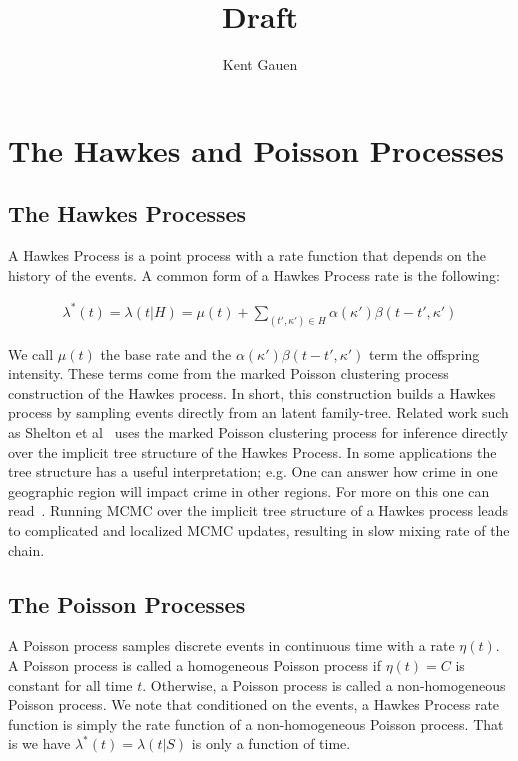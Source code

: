 \documentclass[11pt]{article}
\author{Kent Gauen}
\title{Draft}
\begin{document}
\maketitle

\section{The Hawkes and Poisson Processes}

\subsection{The Hawkes Processes}

\noindent A Hawkes Process is a point process with a rate function that depends on the history of the events. A common form of a Hawkes Process rate is the following:

\begin{align}
  \lambda^*(t)
  =
  \lambda(t|H)
  =
  \mu(t)
  +
  \sum_{(t',\kappa')\in H}\alpha(\kappa')\beta(t-t',\kappa')
\end{align}

\noindent We call $\mu(t)$ the base rate and the $\alpha(\kappa')\beta(t-t',\kappa')$ term the offspring intensity. These terms come from the marked Poisson clustering process construction of the Hawkes process. In short, this construction builds a Hawkes process by sampling events directly from an latent family-tree. Related work such as Shelton et al~\cite{AAAI1816985} uses the marked Poisson clustering process for inference directly over the implicit tree structure of the Hawkes Process. In some applications the tree structure has a useful interpretation; e.g. One can answer how crime in one geographic region will impact crime in other regions. For more on this one can read~\cite{Rasmussen2013}. Running MCMC over the implicit tree structure of a Hawkes process leads to complicated and localized MCMC updates, resulting in slow mixing rate of the chain.

\subsection{The Poisson Processes}

\noindent A Poisson process samples discrete events in continuous time with a rate $\eta(t)$. A Poisson process is called a homogeneous Poisson process if $\eta(t) = C$ is constant for all time $t$. Otherwise, a Poisson process is called a non-homogeneous Poisson process. We note that conditioned on the events, a Hawkes Process rate function is simply the rate function of a non-homogeneous Poisson process. That is we have $\lambda^*(t) = \lambda(t | S)$ is only a function of time.
\end{document}
